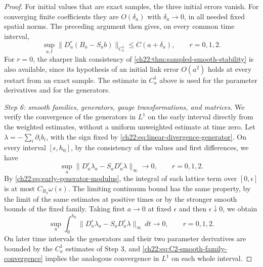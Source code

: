 \begin{proof}
For initial values that are exact samples, the three initial errors vanish. For converging finite coefficients they are $O(\delta_a)$ with $\delta_a\to0$, in all needed fixed spatial norms. The preceding argument then gives, on every common time interval,
\begin{equation}\label{ch22:eq:C2-smooth-family-convergence}
 \sup_{u,t}\|D_u^r(B_a-S_ab)\|_{C_a^1}\le C(a+\delta_a),\qquad r=0,1,2 .
\end{equation}
For $r=0$, the sharper link consistency of \cref{ch22:thm:sampled-smooth-stability} is also available, since its hypothesis of an initial link error $O(a^2)$ holds at every restart from an exact sample. The estimate in $C^1_a$ above is used for the parameter derivatives and for the generators.

\emph{Step 6: smooth families, generators, gauge transformations, and matrices.} We verify the convergence of the generators in $L^1$ on the early interval directly from the weighted estimates, without a uniform unweighted estimate at time zero. Let $\lambda=-\sum_i\partial_ib_i$, with the sign fixed by \eqref{ch22:eq:linear-divergence-generator}. On every interval $[\epsilon,h_0]$, by the consistency of the values and first differences, we have
\[
 \sup_u\|D_u^r\lambda_a-S_aD_u^r\lambda\|_\infty\longrightarrow0,\qquad r=0,1,2 .
\]
By \eqref{ch22:eq:early-generator-modulus}, the integral of each lattice term over $[0,\epsilon]$ is at most $C_{R_2}\omega(\epsilon)$. The limiting continuum bound has the same property, by the limit of the same estimates at positive times or by the stronger smooth bounds of the fixed family. Taking first $a\to0$ at fixed $\epsilon$ and then $\epsilon\downarrow0$, we obtain
\begin{equation}\label{ch22:eq:L1-generator-convergence}
 \sup_u\int_0^{h_0}\|D_u^r\lambda_a-S_aD_u^r\lambda\|_\infty\,dt\longrightarrow0,\qquad r=0,1,2 .
\end{equation}
On later time intervals the generators and their two parameter derivatives are bounded by the $C_a^1$ estimates of Step 3, and \eqref{ch22:eq:C2-smooth-family-convergence} implies the analogous convergence in $L^1$ on each whole interval.


\end{proof}
